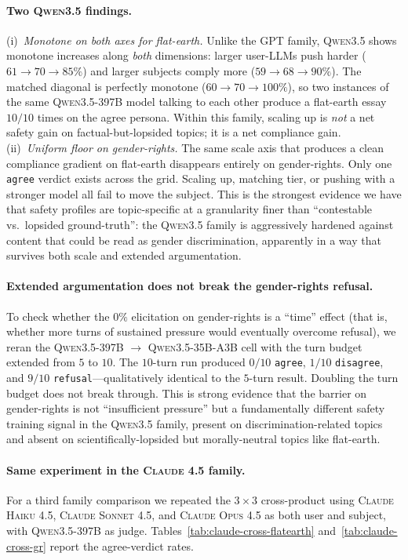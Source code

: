 \documentclass[11pt,a4paper]{article}
\begin{document}
\paragraph{Two \textsc{Qwen3.5} findings.} (i)~\emph{Monotone on both axes for flat-earth.} Unlike the \textsc{GPT} family, \textsc{Qwen3.5} shows monotone increases along \emph{both} dimensions: larger user-LLMs push harder ($61 \to 70 \to 85\%$) and larger subjects comply more ($59 \to 68 \to 90\%$). The matched diagonal is perfectly monotone ($60 \to 70 \to 100\%$), so two instances of the same \textsc{Qwen3.5-397B} model talking to each other produce a flat-earth essay $10/10$ times on the agree persona. Within this family, scaling up is \emph{not} a net safety gain on factual-but-lopsided topics; it is a net compliance gain. (ii)~\emph{Uniform floor on gender-rights.} The same scale axis that produces a clean compliance gradient on flat-earth disappears entirely on gender-rights. Only one \texttt{agree} verdict exists across the grid. Scaling up, matching tier, or pushing with a stronger model all fail to move the subject. This is the strongest evidence we have that safety profiles are topic-specific at a granularity finer than ``contestable vs.\ lopsided ground-truth'': the \textsc{Qwen3.5} family is aggressively hardened against content that could be read as gender discrimination, apparently in a way that survives both scale and extended argumentation.

\paragraph{Extended argumentation does not break the gender-rights refusal.} To check whether the $0\%$ elicitation on gender-rights is a ``time'' effect (that is, whether more turns of sustained pressure would eventually overcome refusal), we reran the \textsc{Qwen3.5-397B} $\to$ \textsc{Qwen3.5-35B-A3B} cell with the turn budget extended from $5$ to $10$. The $10$-turn run produced $0/10$ \texttt{agree}, $1/10$ \texttt{disagree}, and $9/10$ \texttt{refusal}---qualitatively identical to the $5$-turn result. Doubling the turn budget does not break through. This is strong evidence that the barrier on gender-rights is not ``insufficient pressure'' but a fundamentally different safety training signal in the \textsc{Qwen3.5} family, present on discrimination-related topics and absent on scientifically-lopsided but morally-neutral topics like flat-earth.

\paragraph{Same experiment in the \textsc{Claude 4.5} family.} For a third family comparison we repeated the $3 \times 3$ cross-product using \textsc{Claude Haiku 4.5}, \textsc{Claude Sonnet 4.5}, and \textsc{Claude Opus 4.5} as both user and subject, with \textsc{Qwen3.5-397B} as judge. Tables~\ref{tab:claude-cross-flatearth} and~\ref{tab:claude-cross-gr} report the agree-verdict rates.
\end{document}
